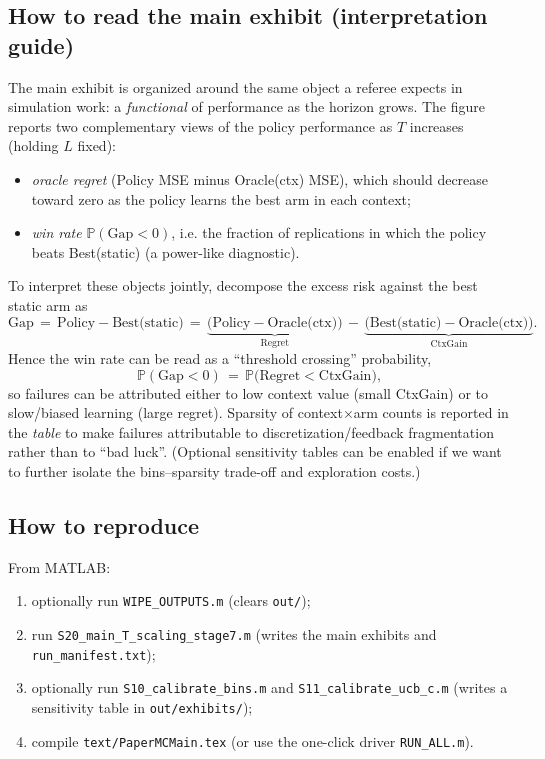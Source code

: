 \subsection{How to read the main exhibit (interpretation guide)}
The main exhibit is organized around the same object a referee expects in simulation work: a \emph{functional} of performance as the horizon grows.
The figure reports two complementary views of the policy performance as $T$ increases (holding $L$ fixed):
\begin{itemize}
\item \emph{oracle regret} (Policy MSE minus Oracle(ctx) MSE), which should decrease toward zero as the policy learns the best arm in each context;
\item \emph{win rate} $\mathbb P(\text{Gap}<0)$, i.e. the fraction of replications in which the policy beats Best(static) (a power-like diagnostic).
\end{itemize}
\noindent
To interpret these objects jointly, decompose the excess risk against the best static arm as
\begin{equation}
\text{Gap} \,=\, \text{Policy}-\text{Best(static)} \,=\, \underbrace{\bigl(\text{Policy}-\text{Oracle(ctx)}\bigr)}_{\text{Regret}} \, - \,
\underbrace{\bigl(\text{Best(static)}-\text{Oracle(ctx)}\bigr)}_{\text{CtxGain}}.
\end{equation}
Hence the win rate can be read as a ``threshold crossing'' probability,
\begin{equation}
\mathbb P(\text{Gap}<0) \,=\, \mathbb P\bigl(\text{Regret}<\text{CtxGain}\bigr),
\end{equation}
so failures can be attributed either to low context value (small CtxGain) or to slow/biased learning (large regret).
Sparsity of context$\times$arm counts is reported in the \emph{table} to make failures attributable to discretization/feedback fragmentation rather than to ``bad luck''. (Optional sensitivity tables can be enabled if we want to further isolate the bins--sparsity trade-off and exploration costs.)

\subsection{How to reproduce}
From MATLAB:
\begin{enumerate}
\item optionally run \texttt{WIPE\_OUTPUTS.m} (clears \texttt{out/});
\item run \texttt{S20\_main\_T\_scaling\_stage7.m} (writes the main exhibits and \texttt{run\_manifest.txt});
\item optionally run \texttt{S10\_calibrate\_bins.m} and \texttt{S11\_calibrate\_ucb\_c.m} (writes a sensitivity table in \texttt{out/exhibits/});
\item compile \texttt{text/PaperMCMain.tex} (or use the one-click driver \texttt{RUN\_ALL.m}).
\end{enumerate}

